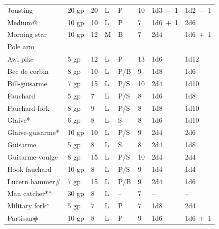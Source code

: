 \begin{minipage}{\textwidth}
\begin{tabular}{|p{}|p{}|p{}|p{}|p{}|p{}|p{}|p{}|}
\hspace{1em}Jousting			& 20 gp	& 20	& L	& P		& 10	& 1d3~$-$~1	& 1d2~$-$~1 \\
\rowcolor[gray]{.9}\hspace{1em}Medium@			& 10 gp	& 10	& L	& P		& 7		& 1d6~+~1	& 2d6 \\
Morning star		& 10 gp	& 12	& M	& B		& 7		& 2d4	& 1d6~+~1 \\
\rowcolor[gray]{.9}Pole arm			& & 	& 	& 	& 	& 	& \\
\rowcolor[gray]{.9}\hspace{1em}Awl pike			& 5 gp	& 12	& L	& P		& 13	& 1d6	& 1d12 \\
\hspace{1em}Bec de corbin		& 8 gp	& 10	& L	& P/B	& 9		& 1d8	& 1d6 \\
\rowcolor[gray]{.9}\hspace{1em}Bill-guisarme		& 7 gp	& 15	& L	& P/S	& 10	& 2d4	& 1d10 \\
\hspace{1em}Fauchard			& 5 gp	& 7		& L	& P/S	& 8		& 1d6	& 1d8 \\
\rowcolor[gray]{.9}\hspace{1em}Fauchard-fork		& 8 gp	& 9		& L	& P/S	& 8		& 1d8	& 1d10 \\
\hspace{1em}Glaive*			& 6 gp	& 8		& L	& S		& 8		& 1d6	& 1d10 \\
\rowcolor[gray]{.9}\hspace{1em}Glaive-guisarme*	& 10 gp	& 10	& L	& P/S	& 9		& 2d4	& 2d6 \\
\hspace{1em}Guisarme			& 5 gp	& 8		& L	& S		& 8		& 2d4	& 1d8 \\
\rowcolor[gray]{.9}\hspace{1em}Guisarme-voulge	& 8 gp	& 15	& L	& P/S	& 10	& 2d4	& 2d4 \\
\hspace{1em}Hook fauchard		& 10 gp	& 8		& L	& P/S	& 9		& 1d4	& 1d4 \\
\rowcolor[gray]{.9}\hspace{1em}Lucern hammer\#	& 7 gp	& 15	& L	& P/B	& 9		& 2d4	& 1d6 \\
\hspace{1em}Man catcher**		& 30 gp	& 8		& L	& --	& 7		& --	& -- \\
\rowcolor[gray]{.9}\hspace{1em}Military fork*	& 5 gp	& 7		& L	& P		& 7		& 1d8	& 2d4 \\
\hspace{1em}Partisan\#			& 10 gp	& 8		& L	& P		& 9		& 1d6	& 1d6~+~1 \\

\end{tabular}
\end{minipage}
